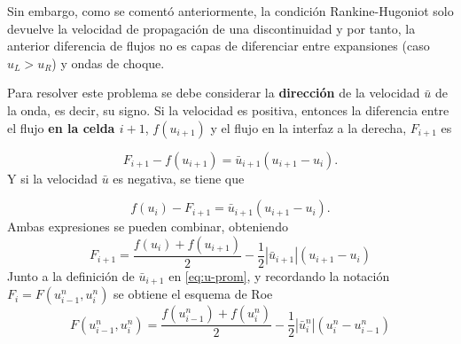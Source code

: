 \documentclass[12pt]{article}
\begin{document}
	Sin embargo, como se comentó anteriormente, la condición Rankine-Hugoniot solo devuelve la velocidad de propagación de una discontinuidad y por tanto, la anterior diferencia de flujos no es capas de diferenciar entre expansiones (caso $u_L > u_R$) y ondas de choque.
	
	Para resolver este problema se debe considerar la \textbf{dirección} de la velocidad $\bar{u}$ de la onda, es decir, su signo. Si la velocidad es positiva, entonces la diferencia entre el flujo \textbf{en la celda $i+1$}, $f(u_{i+1})$ y el flujo en la interfaz a la derecha, $F_{i+1}$ es
	
	\begin{equation}
		F_{i+1} - f(u_{i+1}) = \bar{u}_{i+1} (u_{i+1}-u_{i}).
	\end{equation}
	Y si la velocidad $\bar{u}$ es negativa, se tiene que
	
	\begin{equation}
		f(u_{i}) - F_{i+1} = \bar{u}_{i+1} (u_{i+1}-u_{i}).
	\end{equation}
	Ambas expresiones se pueden combinar, obteniendo
	\begin{equation}
		F_{i+1} = \frac{f(u_{i}) + f(u_{i+1})}{2} - \frac{1}{2}\left|\bar{u}_{i+1}\right|(u_{i+1}-u_{i})
	\end{equation}
	Junto a la definición de $\bar{u}_{i+1}$ en \ref{eq:u-prom}, y recordando la notación $F_i = F(u_{i-1}^{n}, u_{i}^{n})$ se obtiene el esquema de Roe
	\begin{equation}
		\boxed{F(u_{i-1}^{n}, u_{i}^{n}) = \frac{f(u_{i-1}^{n}) + f(u_{i}^{n})}{2} - \frac{1}{2}\left|\bar{u}_{i}^{n}\right|(u_{i}^{n}-u_{i-1}^{n})}
	\end{equation}
\end{document}
